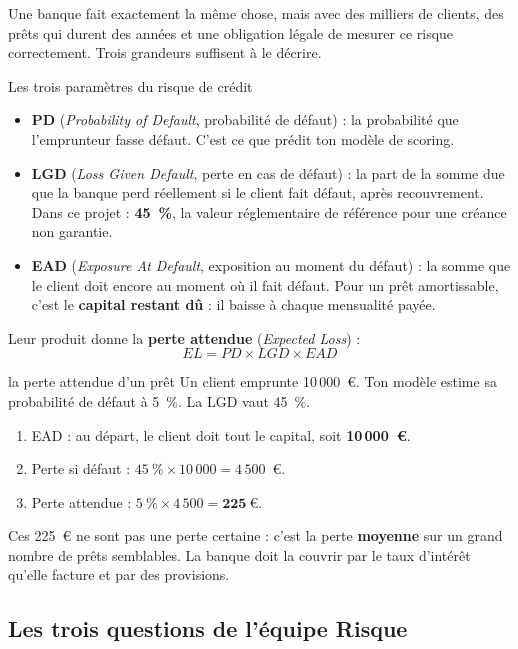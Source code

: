 Une banque fait exactement la même chose, mais avec des milliers de clients, des prêts qui durent des
années et une obligation légale de mesurer ce risque correctement. Trois grandeurs suffisent à le
décrire.

\begin{definition}{Les trois paramètres du risque de crédit}
\begin{itemize}
\item \textbf{PD} (\emph{Probability of Default}, probabilité de défaut) : la probabilité que
l'emprunteur fasse défaut. C'est ce que prédit ton modèle de scoring.
\item \textbf{LGD} (\emph{Loss Given Default}, perte en cas de défaut) : la part de la somme due que la
banque perd réellement si le client fait défaut, après recouvrement. Dans ce projet : \textbf{45~\%}, la
valeur réglementaire de référence pour une créance non garantie.
\item \textbf{EAD} (\emph{Exposure At Default}, exposition au moment du défaut) : la somme que le client
doit encore au moment où il fait défaut. Pour un prêt amortissable, c'est le \textbf{capital restant
dû} : il baisse à chaque mensualité payée.
\end{itemize}
\end{definition}

Leur produit donne la \textbf{perte attendue} (\emph{Expected Loss}) :
\[
\boxed{\;EL = PD \times LGD \times EAD\;}
\]

\begin{calcul}{la perte attendue d'un prêt}
Un client emprunte 10\,000~€. Ton modèle estime sa probabilité de défaut à 5~\%. La LGD vaut 45~\%.
\begin{enumerate}
\item EAD : au départ, le client doit tout le capital, soit \textbf{10\,000~€}.
\item Perte si défaut : $45~\% \times 10\,000 = 4\,500$~€.
\item Perte attendue : $5~\% \times 4\,500 = \mathbf{225~€}$.
\end{enumerate}
Ces 225~€ ne sont pas une perte certaine : c'est la perte \textbf{moyenne} sur un grand nombre de prêts
semblables. La banque doit la couvrir par le taux d'intérêt qu'elle facture et par des provisions.
\end{calcul}

\subsection{Les trois questions de l'équipe Risque}


